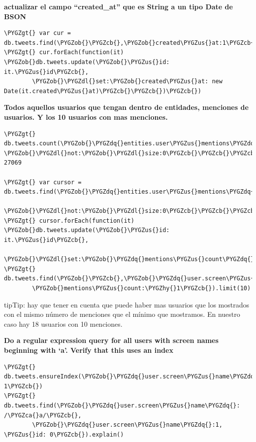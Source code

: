 \documentclass[a4paper,10pt,english]{sphinxmanual}
\def\PYGZus{\char`\_}
\def\PYGZob{\char`\{}
\def\PYGZcb{\char`\}}
\def\PYGZca{\char`\^}
\def\PYGZgt{\char`\>}
\def\PYGZdl{\char`\$}
\def\PYGZhy{\char`\-}
\def\PYGZdq{\char`\"}
\begin{document}
\textbf{actualizar el campo ``created\_at'' que es String a un tipo Date de BSON}

\begin{Verbatim}[commandchars=\\\{\}]
\PYGZgt{} var cur = db.tweets.find(\PYGZob{}\PYGZcb{},\PYGZob{}created\PYGZus{}at:1\PYGZcb{})
\PYGZgt{} cur.forEach(function(it) \PYGZob{}db.tweets.update(\PYGZob{}\PYGZus{}id: it.\PYGZus{}id\PYGZcb{},
        \PYGZob{}\PYGZdl{}set:\PYGZob{}created\PYGZus{}at: new Date(it.created\PYGZus{}at)\PYGZcb{}\PYGZcb{})\PYGZcb{})
\end{Verbatim}

\textbf{Todos aquellos usuarios que tengan dentro de entidades, menciones de usuarios. Y los 10 usuarios con mas menciones.}

\begin{Verbatim}[commandchars=\\\{\}]
\PYGZgt{} db.tweets.count(\PYGZob{}\PYGZdq{}entities.user\PYGZus{}mentions\PYGZdq{}: \PYGZob{}\PYGZdl{}not:\PYGZob{}\PYGZdl{}size:0\PYGZcb{}\PYGZcb{}\PYGZcb{})
27069

\PYGZgt{} var cursor = db.tweets.find(\PYGZob{}\PYGZdq{}entities.user\PYGZus{}mentions\PYGZdq{}:
        \PYGZob{}\PYGZdl{}not:\PYGZob{}\PYGZdl{}size:0\PYGZcb{}\PYGZcb{}\PYGZcb{},\PYGZob{}\PYGZdq{}entities.user\PYGZus{}mentions\PYGZdq{}:1\PYGZcb{})
\PYGZgt{} cursor.forEach(function(it) \PYGZob{}db.tweets.update(\PYGZob{}\PYGZus{}id: it.\PYGZus{}id\PYGZcb{},
        \PYGZob{}\PYGZdl{}set:\PYGZob{}\PYGZdq{}mentions\PYGZus{}count\PYGZdq{}:it.entities.user\PYGZus{}mentions.length\PYGZcb{}\PYGZcb{})\PYGZcb{})
\PYGZgt{} db.tweets.find(\PYGZob{}\PYGZcb{},\PYGZob{}\PYGZdq{}user.screen\PYGZus{}name\PYGZdq{}:1,\PYGZdq{}mentions\PYGZus{}count\PYGZdq{}:1\PYGZcb{}).sort(
        \PYGZob{}mentions\PYGZus{}count:\PYGZhy{}1\PYGZcb{}).limit(10)
\end{Verbatim}

\begin{notice}{tip}{Tip:}
hay que tener en cuenta que puede haber mas usuarios que los mostrados con el mismo número de menciones que el mínimo que mostramos. En nuestro caso hay 18 usuarios con 10 menciones.
\end{notice}

\textbf{Do a regular expression query for all users with screen names beginning with `a'. Verify that this uses an index}

\begin{Verbatim}[commandchars=\\\{\}]
\PYGZgt{} db.tweets.ensureIndex(\PYGZob{}\PYGZdq{}user.screen\PYGZus{}name\PYGZdq{}: 1\PYGZcb{})
\PYGZgt{} db.tweets.find(\PYGZob{}\PYGZdq{}user.screen\PYGZus{}name\PYGZdq{}: /\PYGZca{}a/\PYGZcb{},
        \PYGZob{}\PYGZdq{}user.screen\PYGZus{}name\PYGZdq{}:1, \PYGZus{}id: 0\PYGZcb{}).explain()
\end{Verbatim}
\end{document}
